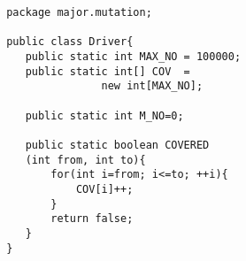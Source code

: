 \begin{lstlisting}
 package major.mutation;

 public class Driver{
    public static int MAX_NO = 100000;
    public static int[] COV  = 
    			new int[MAX_NO];
    			
    public static int M_NO=0;
    
    public static boolean COVERED
    (int from, int to){
        for(int i=from; i<=to; ++i){
            COV[i]++;
        }
        return false;
    }
 }
\end{lstlisting}